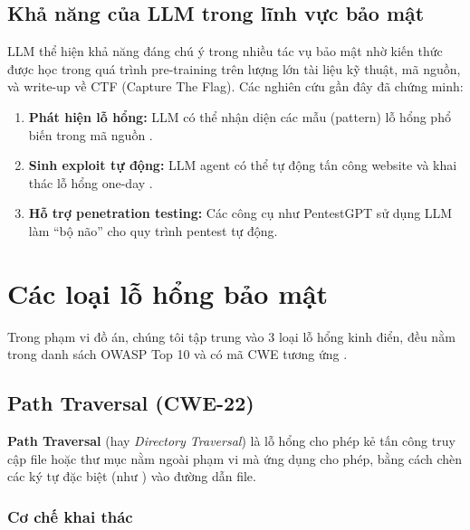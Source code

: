 \documentclass{nt521report}
\begin{document}
\subsection{Khả năng của LLM trong lĩnh vực bảo mật}

LLM thể hiện khả năng đáng chú ý trong nhiều tác vụ bảo mật nhờ kiến thức được học trong quá trình pre-training trên lượng lớn tài liệu kỹ thuật, mã nguồn, và write-up về CTF (Capture The Flag). Các nghiên cứu gần đây đã chứng minh:

\begin{enumerate}
  \item \textbf{Phát hiện lỗ hổng:} LLM có thể nhận diện các mẫu (pattern) lỗ hổng phổ biến trong mã nguồn \cite{pearce2022asleep}.
  \item \textbf{Sinh exploit tự động:} LLM agent có thể tự động tấn công website và khai thác lỗ hổng one-day \cite{fang2024llmagent, fang2024llmexploit}.
  \item \textbf{Hỗ trợ penetration testing:} Các công cụ như PentestGPT \cite{deng2024pentestgpt} sử dụng LLM làm ``bộ não'' cho quy trình pentest tự động.
\end{enumerate}

\section{Các loại lỗ hổng bảo mật}
\label{sec:vulnerabilities}

Trong phạm vi đồ án, chúng tôi tập trung vào 3 loại lỗ hổng kinh điển, đều nằm trong danh sách OWASP Top 10 \cite{owasp2021top10} và có mã CWE tương ứng \cite{cwe2024}.

\subsection{Path Traversal (CWE-22)}
\label{sec:path-traversal}

\begin{defbox}[title={Định nghĩa CWE-22 \cite{cwe22}}]
  \textbf{Path Traversal} (hay \textit{Directory Traversal}) là lỗ hổng cho phép kẻ tấn công truy cập file hoặc thư mục nằm ngoài phạm vi mà ứng dụng cho phép, bằng cách chèn các ký tự đặc biệt (như ) vào đường dẫn file.
\end{defbox}

\subsubsection{Cơ chế khai thác}
\end{document}
